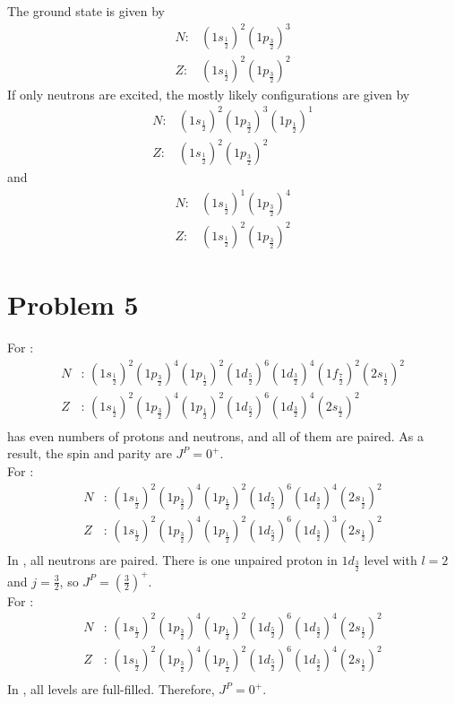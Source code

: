 \documentclass[a4paper]{article}
\theoremstyle{theorem}
\theoremstyle{definition}
\theoremstyle{lemma}
\theoremstyle{corollary}
\theoremstyle{remark}
\theoremstyle{axiom}
\begin{document}
The ground state is given by
\begin{align*}
  N:& (1s_{\frac{1}{2}})^2(1p_{\frac{3}{2}})^3 \\
  Z:& (1s_{\frac{1}{2}})^2(1p_{\frac{3}{2}})^2
\end{align*}
If only neutrons are excited,
the mostly likely configurations are given by
\begin{align*}
  N:& (1s_{\frac{1}{2}})^2(1p_{\frac{3}{2}})^3(1p_{\frac{1}{2}})^1 \\
  Z:& (1s_{\frac{1}{2}})^2(1p_{\frac{3}{2}})^2
\end{align*}
and
\begin{align*}
  N:& (1s_{\frac{1}{2}})^1(1p_{\frac{3}{2}})^4 \\
  Z:& (1s_{\frac{1}{2}})^2(1p_{\frac{3}{2}})^2
\end{align*}

\section*{Problem 5}

For :
\begin{align*}
  N&:\, (1s_{\frac{1}{2}})^2(1p_{\frac{3}{2}})^4(1p_{\frac{1}{2}})^2(1d_{\frac{5}{2}})^6(1d_{\frac{3}{2}})^4(1f_{\frac{7}{2}})^2(2s_{\frac{1}{2}})^2 \\
  Z&:\, (1s_{\frac{1}{2}})^2(1p_{\frac{3}{2}})^4(1p_{\frac{1}{2}})^2(1d_{\frac{5}{2}})^6(1d_{\frac{3}{2}})^4(2s_{\frac{1}{2}})^2 \\
\end{align*}
 has even numbers of protons and neutrons,
and all of them are paired.
As a result,
the spin and parity are \(J^P = 0^+\). \\
For :
\begin{align*}
  N&:\, (1s_{\frac{1}{2}})^2(1p_{\frac{3}{2}})^4(1p_{\frac{1}{2}})^2(1d_{\frac{5}{2}})^6(1d_{\frac{3}{2}})^4(2s_{\frac{1}{2}})^2 \\
  Z&:\, (1s_{\frac{1}{2}})^2(1p_{\frac{3}{2}})^4(1p_{\frac{1}{2}})^2(1d_{\frac{5}{2}})^6(1d_{\frac{3}{2}})^3(2s_{\frac{1}{2}})^2 \\
\end{align*}
In , all neutrons are paired.
There is one unpaired proton in \(1d_{\frac{3}{2}}\) level with \(l = 2\) and \(j = \frac{3}{2}\),
so \(J^P = \left(\frac{3}{2}\right)^+\). \\
For :
\begin{align*}
  N&:\, (1s_{\frac{1}{2}})^2(1p_{\frac{3}{2}})^4(1p_{\frac{1}{2}})^2(1d_{\frac{5}{2}})^6(1d_{\frac{3}{2}})^4(2s_{\frac{1}{2}})^2 \\
  Z&:\, (1s_{\frac{1}{2}})^2(1p_{\frac{3}{2}})^4(1p_{\frac{1}{2}})^2(1d_{\frac{5}{2}})^6(1d_{\frac{3}{2}})^4(2s_{\frac{1}{2}})^2 \\
\end{align*}
In ,
all levels are full-filled.
Therefore,
\(J^P = 0^+\).
\end{document}
